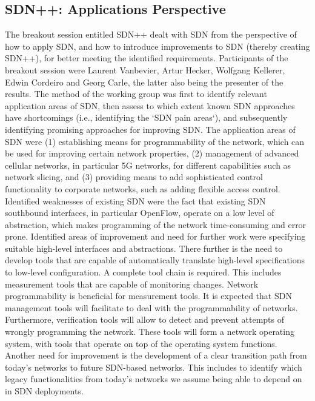 \subsection{SDN++: Applications Perspective}

The breakout session entitled SDN++ dealt with SDN from the perspective of how
to apply SDN, and how to introduce improvements to SDN (thereby creating
SDN++), for better meeting the identified requirements.  Participants of the
breakout session were Laurent Vanbevier, Artur Hecker, Wolfgang Kellerer,
Edwin Cordeiro and Georg Carle, the latter also being the presenter of the
results.  The method of the working group was first to identify relevant
application areas of SDN, then assess to which extent known SDN approaches
have shortcomings (i.e., identifying the `SDN pain areas`), and subsequently
identifying promising approaches for improving SDN.  The application areas of
SDN were (1) establishing means for programmability of the network, which can
be used for improving certain network properties, (2) management of advanced
cellular networks, in particular 5G networks, for different capabilities such
as network slicing, and (3) providing means to add sophisticated control
functionality to corporate networks, such as adding flexible access control.
Identified weaknesses of existing SDN were the fact that existing SDN
southbound interfaces, in particular OpenFlow, operate on a low level of
abstraction, which makes programming of the network time-consuming and error
prone.  Identified areas of improvement and need for further work were
specifying suitable high-level interfaces and abstractions.  There further is
the need to develop tools that are capable of automatically translate
high-level specifications to low-level configuration. A complete tool chain is
required.  This includes measurement tools that are capable of monitoring
changes. Network programmability is beneficial for measurement tools.  It is
expected that SDN management tools will facilitate to deal with the
programmability of networks.  Furthermore, verification tools will allow to
detect and prevent attempts of wrongly programming the network.    These tools
will form a network operating system, with tools that operate on top of the
operating system functions.  Another need for improvement is the development
of a clear transition path from today's networks to future SDN-based networks.
This includes to identify which legacy functionalities from today's networks
we assume being able to depend on in SDN deployments.



